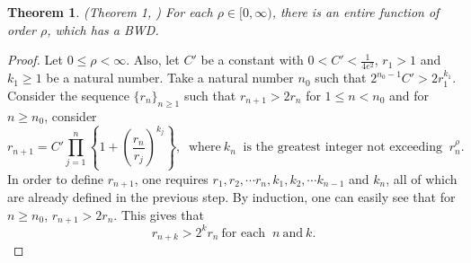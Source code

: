 \documentclass[11pt,a4paper]{article}
\newtheorem{theorem}{Theorem}[section]
\begin{document}
	\begin{theorem}(Theorem 1, \cite{Baker 1985})
		For each $\rho \in [0, \infty)$, there is an entire function  of order $\rho$, which has a BWD.
		\label{exampleBWD-order}
	\end{theorem} 
	\begin{proof}
	Let $0 \leq \rho < \infty$. Also, let $C'$ be a constant with $0<C'<\frac{1}{4e^2}$, $r_1>1$ and  $k_1 \geq 1$ be a natural number.  Take a natural number $n_0$ such that $2^{n_0-1}C'>2r^{k_1}_1$. Consider the sequence $\{r_n\}_{n\geq 1}$ such that $r_{n+1} >  2r_n$ for $1\leq n <n_0$ and for $ n \geq n_0$, consider 
\begin{equation}
	 r_{n+1}=C'\prod_{j=1}^{n}\left\{1+\left(\frac{r_n}{r_j}\right)^{k_j}\right\},~\mbox{ where}~ k_n~\mbox{ is the greatest integer not exceeding }~r_n ^\rho.
	 \label{rn-oredr-example} 
\end{equation}In order to define $r_{n+1}$, one requires $r_1, r_2,\cdots r_n, k_1, k_2, \cdots k_{n-1}$ and $k_n$,  all of which are  already defined in the previous step. By induction, one can easily see that for $n\geq n_0$, $r_{n+1}>2r_n$. This gives that  \begin{equation}
		r_{n+k}>2^{k} r_n ~\mbox{for each }~n~\mbox{and}~ k.
		\label{r-n-growth}
	\end{equation} 
	

\end{proof}
\end{document}
